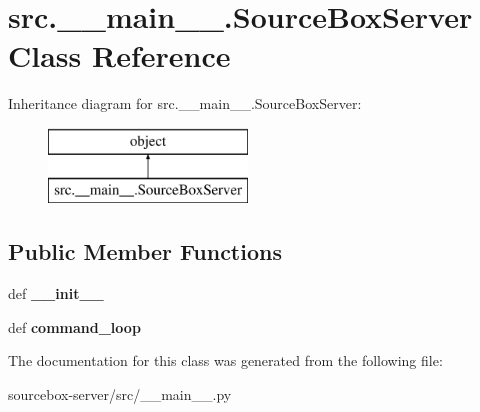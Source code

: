 \hypertarget{classsrc_1_1____main_____1_1_source_box_server}{\section{src.\-\_\-\-\_\-main\-\_\-\-\_\-.\-Source\-Box\-Server Class Reference}
\label{classsrc_1_1____main_____1_1_source_box_server}
}
Inheritance diagram for src.\-\_\-\-\_\-main\-\_\-\-\_\-.\-Source\-Box\-Server\-:\begin{figure}[H]
\begin{center}
\leavevmode
\includegraphics[height=2.000000cm]{classsrc_1_1____main_____1_1_source_box_server}
\end{center}
\end{figure}
\subsection*{Public Member Functions}
\begin{DoxyCompactItemize}
\item 
\hypertarget{classsrc_1_1____main_____1_1_source_box_server_ae7895f894241f906a0dc8378c76eb7e3}{def {\bfseries \-\_\-\-\_\-init\-\_\-\-\_\-}}\label{classsrc_1_1____main_____1_1_source_box_server_ae7895f894241f906a0dc8378c76eb7e3}

\item 
\hypertarget{classsrc_1_1____main_____1_1_source_box_server_a3cf42cc197094e86f618da7b17934c34}{def {\bfseries command\-\_\-loop}}\label{classsrc_1_1____main_____1_1_source_box_server_a3cf42cc197094e86f618da7b17934c34}

\end{DoxyCompactItemize}


The documentation for this class was generated from the following file\-:\begin{DoxyCompactItemize}
\item 
sourcebox-\/server/src/\-\_\-\-\_\-main\-\_\-\-\_\-.\-py\end{DoxyCompactItemize}
